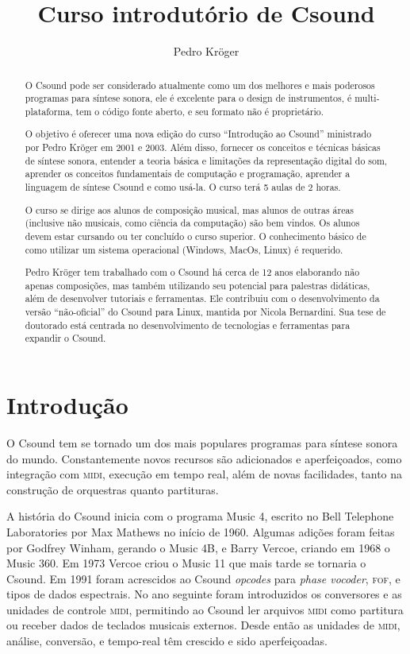 \documentclass[12pt,brazil]{article}
\newcommand{\sigla}[1]{\textsc{#1}}
\newcommand{\eng}[1]{\textit{#1}}
\newcommand{\prog}[1]{\textsf{#1}}
\begin{document}

\title{Curso introdutório de Csound}
\author{Pedro Kröger}
\maketitle

\begin{abstract}
O Csound pode ser considerado atualmente como um dos melhores e mais
poderosos programas para síntese sonora, ele é excelente para o design
de instrumentos, é multi-plataforma, tem o código fonte aberto, e seu
formato não é proprietário.

O objetivo é oferecer uma nova edição do curso ``Introdução ao
Csound'' ministrado por Pedro Kröger em 2001 e 2003. Além disso,
fornecer os conceitos e técnicas básicas de síntese sonora, entender a
teoria básica e limitações da representação digital do som, aprender
os conceitos fundamentais de computação e programação, aprender a
linguagem de síntese Csound e como usá-la. O curso terá 5 aulas de 2
horas.

O curso se dirige aos alunos de composição musical, mas alunos de
outras áreas (inclusive não musicais, como ciência da computação) são
bem vindos.  Os alunos devem estar cursando ou ter concluído o curso
superior.  O conhecimento básico de como utilizar um sistema
operacional (Windows, MacOs, Linux) é requerido.

Pedro Kröger tem trabalhado com o Csound há cerca de 12 anos
elaborando não apenas composições, mas também utilizando seu potencial
para palestras didáticas, além de desenvolver tutoriais e ferramentas.
Ele contribuiu com o desenvolvimento da versão ``não-oficial'' do
Csound para Linux, mantida por Nicola Bernardini. Sua tese de
doutorado está centrada no desenvolvimento de tecnologias e
ferramentas para expandir o Csound.
\end{abstract}

\thispagestyle{empty}

\section{Introdução}
O Csound tem se tornado um dos mais populares programas para síntese
sonora do mundo. Constantemente novos recursos são adicionados e
aperfeiçoados, como integração com \sigla{midi}, execução em tempo
real, além de novas facilidades, tanto na construção de orquestras
quanto partituras.

A história do Csound inicia com o programa \prog{Music 4}, escrito no
Bell Telephone Laboratories por Max Mathews no início de 1960. Algumas
adições foram feitas por Godfrey Winham, gerando o \prog{Music 4B}, e
Barry Vercoe, criando em 1968 o \prog{Music 360}. Em 1973 Vercoe criou
o \prog{Music 11} que mais tarde se tornaria o Csound. Em 1991 foram
acrescidos ao Csound \eng{opcodes} para \eng{phase vocoder},
\sigla{fof}, e tipos de dados espectrais. No ano seguinte foram
introduzidos os conversores e as unidades de controle \sigla{midi},
permitindo ao Csound ler arquivos \sigla{midi} como partitura ou
receber dados de teclados musicais externos. Desde então as unidades
de \sigla{midi}, análise, conversão, e tempo-real têm crescido e sido
aperfeiçoadas.
\end{document}
